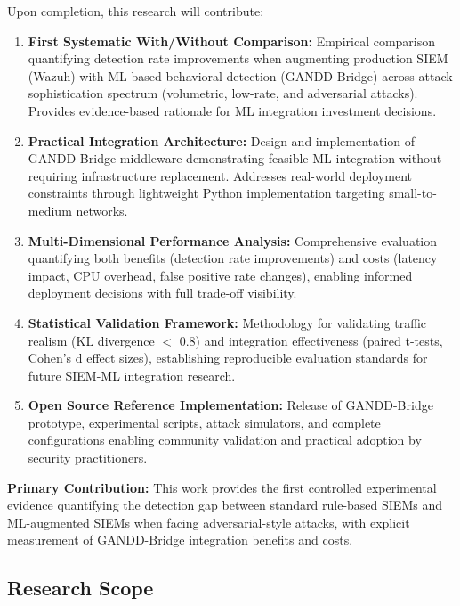 Upon completion, this research will contribute:

\begin{enumerate}
    \item \textbf{First Systematic With/Without Comparison:} Empirical comparison quantifying detection rate improvements when augmenting production SIEM (Wazuh) with ML-based behavioral detection (GANDD-Bridge) across attack sophistication spectrum (volumetric, low-rate, and adversarial attacks). Provides evidence-based rationale for ML integration investment decisions.
    
    \item \textbf{Practical Integration Architecture:} Design and implementation of GANDD-Bridge middleware demonstrating feasible ML integration without requiring infrastructure replacement. Addresses real-world deployment constraints through lightweight Python implementation targeting small-to-medium networks.
    
    \item \textbf{Multi-Dimensional Performance Analysis:} Comprehensive evaluation quantifying both benefits (detection rate improvements) and costs (latency impact, CPU overhead, false positive rate changes), enabling informed deployment decisions with full trade-off visibility.
    
    \item \textbf{Statistical Validation Framework:} Methodology for validating traffic realism (KL divergence $<$ 0.8) and integration effectiveness (paired t-tests, Cohen's d effect sizes), establishing reproducible evaluation standards for future SIEM-ML integration research.
    
    \item \textbf{Open Source Reference Implementation:} Release of GANDD-Bridge prototype, experimental scripts, attack simulators, and complete configurations enabling community validation and practical adoption by security practitioners.
\end{enumerate}

\textbf{Primary Contribution:} This work provides the first controlled experimental evidence quantifying the detection gap between standard rule-based SIEMs and ML-augmented SIEMs when facing adversarial-style attacks, with explicit measurement of GANDD-Bridge integration benefits and costs.

\subsection{Research Scope}

